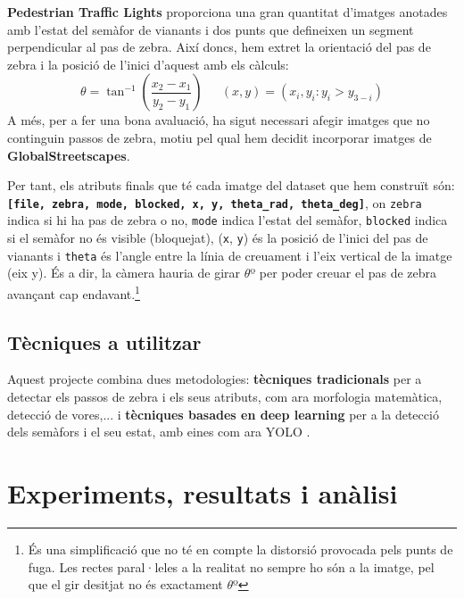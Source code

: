 \documentclass[10pt,a4paper,twocolumn,twoside]{article}
\begin{document}
\textbf{Pedestrian Traffic Lights} proporciona una gran quantitat d'imatges anotades amb l'estat del semàfor de vianants i dos punts que defineixen un segment perpendicular al pas de zebra.
Així doncs, hem extret la orientació del pas de zebra i la posició de l'inici d'aquest amb els càlculs:
\begin{equation*}
	\theta = \tan^{-1}\left( \frac{x_2 - x_1}{y_2 - y_1} \right) \ \ \quad
	(x, y) = (x_i, y_i : y_i > y_{3-i})
\end{equation*}
A més, per a fer una bona avaluació, ha sigut necessari afegir imatges que no continguin passos de zebra, motiu pel qual hem decidit incorporar imatges de \textbf{GlobalStreetscapes}.

Per tant, els atributs finals que té cada imatge del dataset que hem construït són: \textbf{\texttt{[file, zebra, mode, blocked, x, y, theta\_rad, theta\_deg]}}, on \texttt{zebra} indica si hi ha pas de zebra o no, \texttt{mode} indica l'estat del semàfor, \texttt{blocked} indica si el semàfor no és visible (bloquejat), (\texttt{x}, \texttt{y}) és la posició de l'inici del pas de vianants i \texttt{theta} és l'angle entre la línia de creuament i l’eix vertical de la imatge (eix y). És a dir, la càmera hauria de girar $\theta$º per poder creuar el pas de zebra avançant cap endavant.\footnote{És una simplificació que no té en compte la distorsió provocada pels punts de fuga. Les rectes paral·leles a la realitat no sempre ho són a la imatge, pel que el gir desitjat no és exactament $\theta$º}

\subsection{Tècniques a utilitzar}
 
 Aquest projecte combina dues metodologies: \textbf{tècniques tradicionals} per a detectar els passos de zebra i els seus atributs, com ara morfologia matemàtica, detecció de vores,... i \textbf{tècniques basades en deep learning} per a la detecció dels semàfors i el seu estat, amb eines com ara YOLO \cite{YOLO}.
 
\section{Experiments, resultats i anàlisi}
\end{document}
